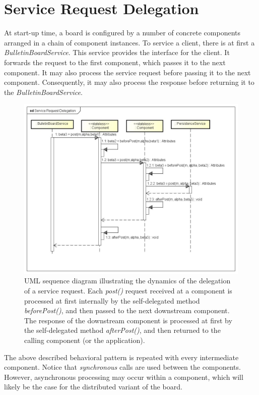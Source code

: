 \documentclass[oneside]{scrreprt}
\begin{document}
\section{Service Request Delegation}

At start-up time, a board is configured by a number
of concrete components arranged in a chain of component
instances. To service a client, there is at first a \emph{BulletinBoardService}. This service
provides the interface for the client.  It forwards the request to the first
component, which passes it to the next component. It may also process the
service request before passing it to the next
component. Consequently, it may also process the
response before returning it to the \emph{BulletinBoardService}.

\begin{figure}[ht]
\centerline{
\includegraphics[width=1.0\textwidth]{figs/service-request-delegation}}
\caption{UML sequence diagram illustrating the dynamics of the
delegation of a service request. Each \emph{post()} request received
at a component is processed at first internally by the
self-delegated method \emph{beforePost()}, and then passed to
the next downstream component. The response of the downstream
component is processed at first by the self-delegated
method \emph{afterPost()}, and then returned to the calling
component (or the application).}
\label{fig:service-request-delegation}
\end{figure}

The above described behavioral pattern is repeated with
every intermediate component. Notice that \emph{synchronous} calls
are used between the components.
However, asynchronous processing may occur within
a component, which will likely be the case for the
distributed variant of the board.
\end{document}
